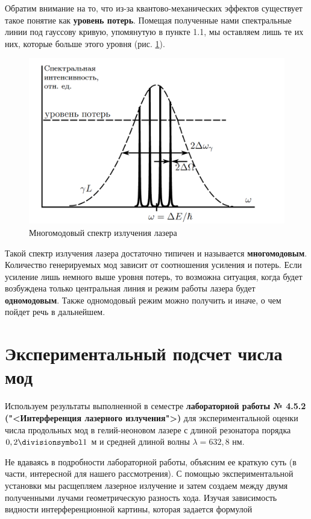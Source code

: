\documentclass[12pt]{kiarticle}
\begin{document}
Обратим внимание на то, что из-за квантово-механических эффектов существует такое понятие как \textbf{уровень потерь}. Помещая полученные нами спектральные линии под гауссову кривую, упомянутую в пункте 1.1, мы оставляем лишь те их них, которые больше этого уровня (рис. \ref{mods}).

\begin{figure}[h!]
	\centering
	\includegraphics[width=0.7\linewidth]{mods.png}
	\caption{Многомодовый спектр излучения лазера}
	\label{mods}
\end{figure}

Такой спектр излучения лазера достаточно типичен и называется \textbf{многомодовым}. Количество генерируемых мод
зависит от соотношения усиления и потерь. Если усиление лишь немного выше уровня потерь, то возможна ситуация, когда будет возбуждена
только центральная линия и режим работы лазера будет \textbf{одномодовым}. Также одномодовый режим можно получить и иначе, о чем пойдет речь в дальнейшем.

\section{Экспериментальный подсчет числа мод}

Используем результаты выполненной в семестре \textbf{лабораторной работы № 4.5.2 ("<Интерференция лазерного излучения">)} для экспериментальной оценки числа продольных мод в гелий-неоновом лазере с длиной резонатора порядка $ 0,2 \divisionsymbol 1 $ м и средней длиной волны $ \lambda = 632,8 $ нм. 

Не вдаваясь в подробности лабораторной работы, объясним ее краткую суть (в части, интересной для нашего рассмотрения). С помощью экспериментальной установки мы расщепляем лазерное излучение и затем создаем между двумя полученными лучами геометрическую разность хода. Изучая зависимость видности интерференционной картины, которая задается формулой
\end{document}
